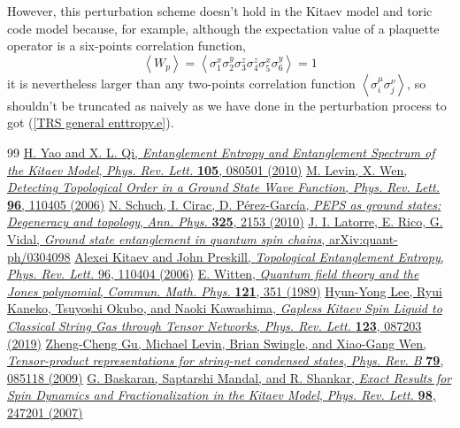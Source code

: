 \documentclass[12font]{article}
\theoremstyle{definition}
\numberwithin{equation}{section}
\newcommand{\anglelr}[1]{\left\langle #1 \right\rangle}
\begin{document}
However, this perturbation scheme doesn't hold in the Kitaev model and toric code model because, for example, although the expectation value of a plaquette operator is a six-points correlation function,
\[
\anglelr{W_p} = \anglelr{\sigma^x_1\sigma^y_2\sigma^z_3\sigma^z_4\sigma^x_5\sigma^y_6} = 1
\]
it is nevertheless larger than any two-points correlation function $\anglelr{\sigma^\mu_i\sigma^\nu_j}$, so shouldn't be truncated as naively as we have done in the perturbation process to got (\ref{TRS general enttropy.e}).






\begin{thebibliography}{99}
    \href{https://doi.org/10.1103/PhysRevLett.105.080501}{H. Yao and X. L. Qi, \emph{Entanglement Entropy and Entanglement Spectrum of the Kitaev Model}, \emph{Phys. Rev. Lett.} \textbf{105}, 080501 (2010)}
    \href{https://doi.org/10.1103/PhysRevLett.96.110405}{M. Levin, X. Wen, \emph{Detecting Topological Order in a Ground State Wave Function}, \emph{Phys. Rev. Lett.} \textbf{96}, 110405 (2006)}
    \href{https://doi.org/10.1016/j.aop.2010.05.008}{N. Schuch, I. Cirac, D. P\'erez-Garc\'ia, \emph{PEPS as ground states: Degeneracy and topology}, \emph{Ann. Phys.} \textbf{325}, 2153 (2010)}
    \href{https://arxiv.org/abs/quant-ph/0304098}{J. I. Latorre, E. Rico, G. Vidal, \emph{Ground state entanglement in quantum spin chains},	arXiv:quant-ph/0304098}
    \href{https://doi.org/10.1103/PhysRevLett.96.110404}{Alexei Kitaev and John Preskill, \emph{Topological Entanglement Entropy}, \emph{Phys. Rev. Lett.} 96, 110404 (2006)}
    \href{https://link.springer.com/article/10.1007/BF01217730}{E. Witten, \emph{Quantum field theory and the Jones polynomial}, \emph{Commun. Math. Phys.} \textbf{121}, 351 (1989)}
    \href{https://doi.org/10.1103/PhysRevLett.123.087203}{Hyun-Yong Lee, Ryui Kaneko, Tsuyoshi Okubo, and Naoki Kawashima, \emph{Gapless Kitaev Spin Liquid to Classical String Gas through Tensor Networks}, \emph{Phys. Rev. Lett.} \textbf{123}, 087203 (2019)}
    \href{https://doi.org/10.1103/PhysRevB.79.085118}{Zheng-Cheng Gu, Michael Levin, Brian Swingle, and Xiao-Gang Wen, \emph{Tensor-product representations for string-net condensed states}, \emph{Phys. Rev. B} \textbf{79}, 085118 (2009)}
    \href{https://doi.org/10.1103/PhysRevLett.98.247201}{G. Baskaran, Saptarshi Mandal, and R. Shankar, \emph{Exact Results for Spin Dynamics and Fractionalization in the Kitaev Model}, \emph{Phys. Rev. Lett.} \textbf{98}, 247201 (2007)}

\end{thebibliography}
\end{document}
